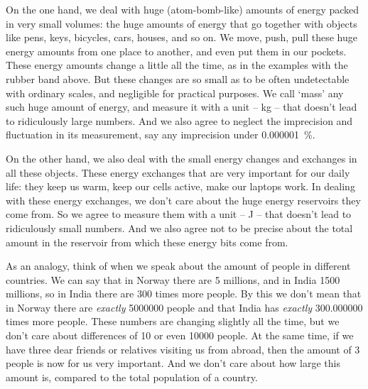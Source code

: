 \documentclass[a4paper,12pt,%
onecolumn,oneside,%
british%
]{memoir}
\renewcommand*{\|}[1][]{\nonscript\:#1\vert\nonscript\:\mathopen{}}
\begin{document}
On the one hand, we deal with huge (atom-bomb-like) amounts of energy packed in very small volumes: the huge amounts of energy that go together with objects like pens, keys, bicycles, cars, houses, and so on. We move, push, pull these huge energy amounts from one place to another, and even put them in our pockets. These energy amounts change a little all the time, as in the examples with the rubber band above. But these changes are so small as to be often undetectable with ordinary scales, and negligible for practical purposes. We call \enquote*{mass} any such huge amount of energy, and measure it with a unit -- \unit{kg} -- that doesn't lead to ridiculously large numbers. And we also agree to neglect the imprecision and fluctuation in its measurement, say any imprecision under \qty{0.000001}{\percent}. %

On the other hand, we also deal with the small energy changes and exchanges in all these objects. These energy exchanges that are very important for our daily life: they keep us warm, keep our cells active, make our laptops work. In dealing with these energy exchanges, we don't care about the huge energy reservoirs they come from. So we agree to measure them with a unit -- \unit{J} -- that doesn't lead to ridiculously small numbers. And we also agree not to be precise about the total amount in the reservoir from which these energy bits come from.

As an analogy, think of when we speak about the amount of people in different countries. We can say that in Norway there are \num{5} millions, and in India \num{1500} millions, so in India there are \num{300} times more people. By this we don't mean that in Norway there are \emph{exactly} \num{5000000} people and that India has \emph{exactly} \num{300.000000} times more people. These numbers are changing slightly all the time, but we don't care about differences of 10 or even \num{10000} people. At the same time, if we have three dear friends or relatives visiting us from abroad, then the amount of \num{3} people is now for us very important. And we don't care about how large this amount is, compared to the total population of a country.
\end{document}
